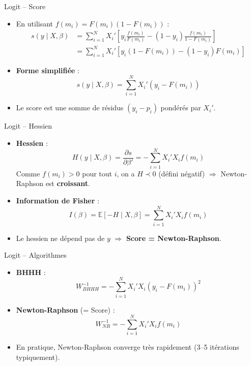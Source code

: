 \documentclass[11pt,aspectratio=169]{beamer}
\newcommand{\E}{\mathbb{E}}
\begin{document}
\begin{frame}{Logit -- Score}

\begin{itemize}

\item En utilisant $f(m_i) = F(m_i)(1 - F(m_i))$ :
  \begin{align*}
      s(y \mid X, \beta) &= \sum_{i=1}^{N} X_i' \left[ y_i \frac{f(m_i)}{F(m_i)} - (1-y_i) \frac{f(m_i)}{1-F(m_i)} \right] \\
      &= \sum_{i=1}^{N} X_i' \left[ y_i (1-F(m_i)) - (1-y_i) F(m_i) \right]
  \end{align*}

\item \textbf{Forme simplifiée} :
  \[
  \boxed{s(y \mid X, \beta) = \sum_{i=1}^{N} X_i' (y_i - F(m_i))}
  \]

\item Le score est une somme de résidus $(y_i - p_i)$ pondérés par $X_i'$.

\end{itemize}

\end{frame}

\begin{frame}{Logit -- Hessien}

\begin{itemize}

\item \textbf{Hessien} :
  \[
  H(y \mid X, \beta) = \frac{\partial s}{\partial \beta'} = -\sum_{i=1}^{N} X_i' X_i f(m_i)
  \]
  Comme $f(m_i) > 0$ pour tout $i$, on a $H \prec 0$ (défini négatif)
  $\Rightarrow$ Newton-Raphson est \textbf{croissant}.\newline

\item \textbf{Information de Fisher} :
  \[
  I(\beta) = \E[-H \mid X, \beta] = \sum_{i=1}^{N} X_i' X_i f(m_i)
  \]

\item Le hessien ne dépend pas de $y$ $\Rightarrow$
  \textbf{Score = Newton-Raphson}.

\end{itemize}

\end{frame}

\begin{frame}{Logit -- Algorithmes}

\begin{itemize}

\item \textbf{BHHH} :
  \[
  W_{BHHH}^{-1} = -\sum_{i=1}^{N} X_i' X_i (y_i - F(m_i))^2
  \]

\item \textbf{Newton-Raphson} (= Score) :
  \[
  W_{NR}^{-1} = -\sum_{i=1}^{N} X_i' X_i f(m_i)
  \]

\item En pratique, Newton-Raphson converge très rapidement (3--5 itérations
  typiquement).

\end{itemize}

\end{frame}
\end{document}
